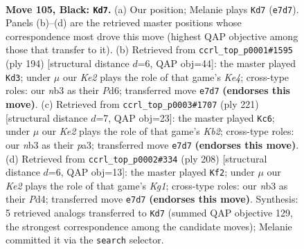 \documentclass[11pt]{article}
\begin{document}
\clearpage

\begin{figure}[p]\centering
\begin{subfigure}{0.46\textwidth}\centering
\resizebox{\linewidth}{!}{%
\newchessgame
\chessboard[
  setfen={8/4k3/8/4K3/8/1N6/2R3Pr/8 b - - 75 105},
  showmover=false,
  pgfstyle=straightmove, color=movearrow, markmove={e7-d7}
]}
\caption{}
\end{subfigure}\hfill
\begin{subfigure}{0.46\textwidth}\centering
\resizebox{\linewidth}{!}{%
\newchessgame
\chessboard[
  setfen={8/8/r2P4/6k1/4K3/8/p7/R7 w - - 1 98},
  showmover=false,
  pgfstyle=straightmove, color=movearrow, markmove={e4-d3}
]}
\caption{}
\end{subfigure}
\\[4pt]
\begin{subfigure}{0.46\textwidth}\centering
\resizebox{\linewidth}{!}{%
\newchessgame
\chessboard[
  setfen={7R/1k6/8/7P/8/P6r/1K6/8 b - - 0 111},
  showmover=false,
  pgfstyle=straightmove, color=movearrow, markmove={b7-c6}
]}
\caption{}
\end{subfigure}\hfill
\begin{subfigure}{0.46\textwidth}\centering
\resizebox{\linewidth}{!}{%
\newchessgame
\chessboard[
  setfen={2R5/8/3k4/8/2pP4/2r5/8/6K1 w - - 0 105},
  showmover=false,
  pgfstyle=straightmove, color=movearrow, markmove={g1-f2}
]}
\caption{}
\end{subfigure}
\caption{\textbf{Move 105, Black: \texttt{Kd7}.} (a) Our position; Melanie plays \texttt{Kd7} (\texttt{e7d7}). Panels (b)--(d) are the retrieved master positions whose correspondence most drove this move (highest QAP objective among those that transfer to it). (b) Retrieved from \texttt{ccrl\_top\_p0001\#1595} (ply 194) [structural distance $d$=6, QAP obj=44]: the master played \texttt{Kd3}; under $\mu$ our \emph{Ke2} plays the role of that game's \emph{Ke4}; cross-type roles: our \emph{n}b3 as their \emph{P}d6; transferred move \texttt{e7d7} \textbf{(endorses this move)}. (c) Retrieved from \texttt{ccrl\_top\_p0003\#1707} (ply 221) [structural distance $d$=7, QAP obj=23]: the master played \texttt{Kc6}; under $\mu$ our \emph{Ke2} plays the role of that game's \emph{Kb2}; cross-type roles: our \emph{n}b3 as their \emph{p}a3; transferred move \texttt{e7d7} \textbf{(endorses this move)}. (d) Retrieved from \texttt{ccrl\_top\_p0002\#334} (ply 208) [structural distance $d$=6, QAP obj=13]: the master played \texttt{Kf2}; under $\mu$ our \emph{Ke2} plays the role of that game's \emph{Kg1}; cross-type roles: our \emph{n}b3 as their \emph{P}d4; transferred move \texttt{e7d7} \textbf{(endorses this move)}. Synthesis: 5 retrieved analogs transferred to \texttt{Kd7} (summed QAP objective 129, the strongest correspondence among the candidate moves); Melanie committed it via the \texttt{search} selector.}
\label{fig:thought-m209}
\end{figure}
\end{document}
